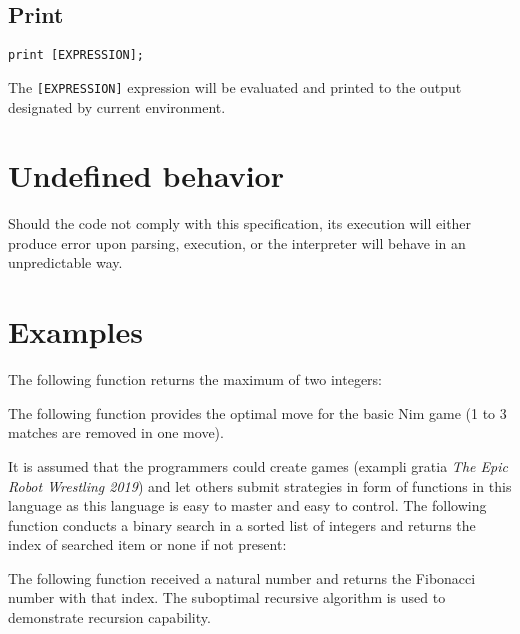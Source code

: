 \documentclass[a4paper,11pt,openany]{article}
\begin{document}
\subsection{Print}

\begin{lstlisting}[frame=none]
print [EXPRESSION];\end{lstlisting}

The \texttt{[EXPRESSION]} expression will be evaluated and printed to the output designated by current environment.

\section{Undefined behavior}

Should the code not comply with this specification, its execution will either produce error upon parsing, execution, or the interpreter will behave in an unpredictable way.

\section{Examples}
The following function returns the maximum of two integers:

The following function provides the optimal move for the basic Nim game (1 to 3 matches are removed in one move).

It is assumed that the programmers could create games (exampli gratia \textit{The Epic Robot Wrestling 2019}) and let others submit strategies in form of functions in this language as this language is easy to master and easy to control.
The following function conducts a binary search in a sorted list of integers and returns the index of searched item or none if not present:

The following function received a natural number and returns the Fibonacci number with that index. The suboptimal recursive algorithm is used to demonstrate recursion capability.

\end{document}
